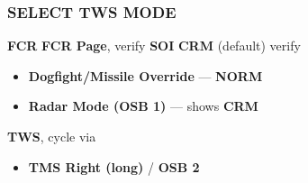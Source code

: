 \marginfigeometry

\subsubsection{SELECT TWS MODE}
\begin{checklistenumerate}
    \dotfill \textbf{FCR}
    \dotfill \textbf{FCR Page}, verify \textbf{SOI}
    \dotfill \textbf{CRM} (default) verify
    \begin{itemize}
        \item \textbf{Dogfight/Missile Override} --- \textbf{NORM}
        \item \textbf{Radar Mode (OSB 1)} --- shows \textbf{CRM}
    \end{itemize}
    \dotfill \textbf{TWS},
    cycle via 
    \begin{itemize}
        \item \textbf{TMS Right (long)} / \textbf{OSB 2} 
    \end{itemize}
\end{checklistenumerate}

